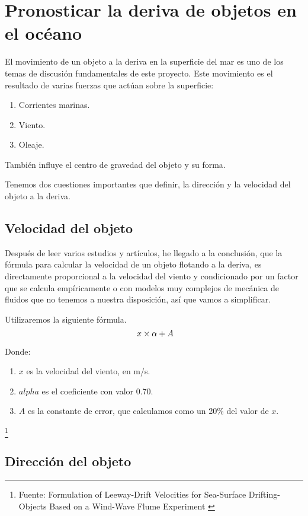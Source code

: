 \section{Pronosticar la deriva de objetos en el océano}

El movimiento de un objeto a la deriva en la superficie del mar es uno de los temas de discusión fundamentales de este proyecto. Este movimiento es el resultado de varias fuerzas que actúan sobre la superficie:

\begin{enumerate}
\item Corrientes marinas.
\item Viento.
\item Oleaje.
\end{enumerate}


También influye el centro de gravedad del objeto y su forma.

Tenemos dos cuestiones importantes que definir, la dirección y la velocidad del objeto a la deriva.

\subsection{Velocidad del objeto}

Después de leer varios estudios y artículos, he llegado a la conclusión, que la fórmula para calcular la velocidad de un objeto flotando a la deriva, es directamente proporcional a la velocidad del viento y condicionado por un factor que se calcula empíricamente o con modelos muy complejos de mecánica de fluidos que no tenemos a nuestra disposición, así que vamos a simplificar.

Utilizaremos la siguiente fórmula.
\[\
   x \times \alpha + A \\  
\]

Donde:
\begin{enumerate}
\item $x$ es la velocidad del viento, en m/s.
\item $alpha$ es el coeficiente con valor 0.70.
\item $A$ es la constante de error, que calculamos como un 20\% del valor de $x$.
\end{enumerate}

\footnote{Fuente: Formulation of Leeway-Drift Velocities for Sea-Surface
Drifting-Objects Based on a Wind-Wave Flume Experiment \cite{VDERIVA}}



\subsection{Dirección del objeto}


